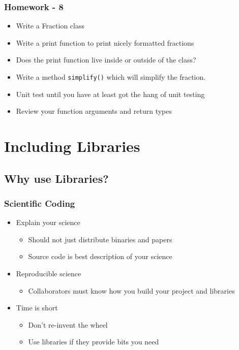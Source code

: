 \subsubsection{Homework - 8}\label{homework---8}

\begin{itemize}
\itemsep1pt\parskip0pt
\item
  Write a Fraction class
\item
  Write a print function to print nicely formatted fractions
\item
  Does the print function live inside or outside of the class?
\item
  Write a method \texttt{simplify()} which will simplify the fraction.
\item
  Unit test until you have at least got the hang of unit testing
\item
  Review your function arguments and return types
\end{itemize}

\section{Including Libraries}\label{including-libraries}

\subsection{Why use Libraries?}\label{why-use-libraries}

\subsubsection{Scientific Coding}\label{scientific-coding}

\begin{itemize}
\itemsep1pt\parskip0pt
\item
  Explain your science

  \begin{itemize}
  \itemsep1pt\parskip0pt
  \item
    Should not just distribute binaries and papers
  \item
    Source code is best description of your science
  \end{itemize}
\item
  Reproducible science

  \begin{itemize}
  \itemsep1pt\parskip0pt
  \item
    Collaborators must know how you build your project and libraries
  \end{itemize}
\item
  Time is short

  \begin{itemize}
  \itemsep1pt\parskip0pt
  \item
    Don't re-invent the wheel
  \item
    Use libraries if they provide bits you need
  \end{itemize}
\end{itemize}

